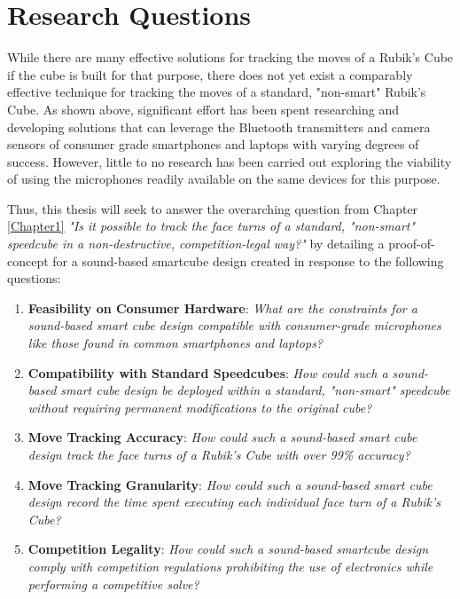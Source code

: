 \section{Research Questions}
While there are many effective solutions for tracking the moves of a Rubik's Cube if the cube is built for that purpose, there does not yet exist a comparably effective technique for tracking the moves of a standard, "non-smart" Rubik's Cube.
As shown above, significant effort has been spent researching and developing solutions that can leverage the Bluetooth transmitters and camera sensors of consumer grade smartphones and laptops with varying degrees of success.
However, little to no research has been carried out exploring the viability of using the microphones readily available on the same devices for this purpose.

Thus, this thesis will seek to answer the overarching question from Chapter \ref{Chapter1} \emph{"Is it possible to track the face turns of a standard, "non-smart" speedcube in a non-destructive, competition-legal way?"} by detailing a proof-of-concept for a sound-based smartcube design created in response to the following questions:

\begin{enumerate}
    \item \textbf{Feasibility on Consumer Hardware}: \emph{What are the constraints for a sound-based smart cube design compatible with consumer-grade microphones like those found in common smartphones and laptops?}
    \item \textbf{Compatibility with Standard Speedcubes}: \emph{How could such a sound-based smart cube design be deployed within a standard, "non-smart" speedcube without requiring permanent modifications to the original cube?}
    \item \textbf{Move Tracking Accuracy}: \emph{How could such a sound-based smart cube design track the face turns of a Rubik's Cube with over 99\% accuracy?}
    \item \textbf{Move Tracking Granularity}: \emph{How could such a sound-based smart cube design record the time spent executing each individual face turn of a Rubik's Cube?}
    \item \textbf{Competition Legality}: \emph{How could such a sound-based smartcube design comply with competition regulations prohibiting the use of electronics while performing a competitive solve?}
\end{enumerate}
